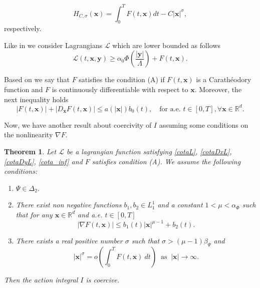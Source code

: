 \documentclass[twoside]{article}
\newtheorem{thm}{Theorem}[section]
\theoremstyle{remark}
\renewcommand{\b}[1]{\boldsymbol{#1}}
\newcommand{\rr}{\mathbb{R}}
\renewcommand{\leq}{\leqslant}
\begin{document}
\begin{equation}\label{eq:functional_H}
 H_{C,\sigma}(\b{x})=\int_0^TF(t,\b{x})dt-C|\b{x}|^{\sigma},
\end{equation}
respectively.

Like in \cite{ABGMS2015} we consider Lagrangians $\mathcal{L}$ which are lower bounded as follows 
\begin{equation}\label{cota_inf}
\mathcal{L}(t,\b{x},\b{y})\geq \alpha_0\Phi\left(\frac{|\b{y}|}{\Lambda}\right)+ F(t,\b{x}).
\end{equation}

Based on \cite{mawhin2010critical} we say that $F$ satisfies the condition (A) if  $F(t,\b{x})$ is a Carath\'eo\-dory function and  $F$ is continuously differentiable with respect to $\b{x}$. Moreover, the next inequality holds 
\begin{equation}\label{condA2}|F(t,\b{x})|+ |D_{\b{x}}F(t,\b{x})|\leq a(|\b{x}|)b_0(t),\quad\text{for a.e. }t\in [0,T], \forall\b{x}\in\rr^d.
\end{equation}

Now, we have another result about coercivity of $I$ assuming some conditions on the nonlinearity  $\nabla F$. 

\begin{thm}\label{coercitividad-r}
Let  $\mathcal{L}$ be a lagrangian function satisfying \eqref{cotaL}, \eqref{cotaDxL}, \eqref{cotaDyL}, \eqref{cota_inf}  and $F$ satisfies condition (A). We assume the following conditions:
\begin{enumerate}
\item $\Psi\in\Delta_2$.
\item There exist  non negative functions  $b_1,b_2 \in L^1_1$ and a constant $1<\mu<\alpha_{\Phi}$  such that 
for any $\b{x}\in\rr^d$ and a.e. $t\in [0,T]$
\begin{equation}\label{holder_cont-mu}
  \left| \nabla F(t,\b{x}) \right|\leq b_1(t)|\b{x}|^{\mu-1}+b_2(t).
\end{equation}
\item There exists a real positive number $\sigma$ such that $\sigma>(\mu-1)\beta_{\Psi}$ and
\begin{equation}\label{propiedad-coercividad-sigma}
|\b{x}|^{\sigma}=o\left(\int_{0}^{T}F(t,\b{x})\ dt\right)\;\;\mbox{as}\;\;|\b{x}|\to \infty.
\end{equation}
\end{enumerate}
Then  the action integral $I$ is coercive.
\end{thm}
\end{document}
